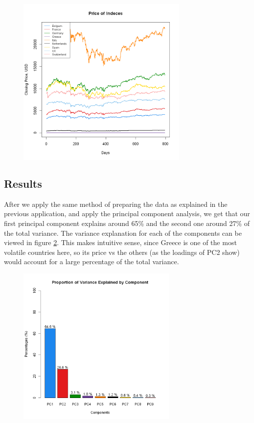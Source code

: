 \documentclass{article}
\begin{document}
\begin{figure}[H]
    \caption{}
    \centering
    \includegraphics[width=0.75\textwidth]{index_prices.png}
    \label{index_prices}
\end{figure}

\subsection{Results}

After we apply the same method of preparing the data as explained in the previous application, and apply the principal component analysis, we get that our first principal component explains around 65\% and the second one around 27\% of the total variance. The variance explanation for each of the components can be viewed in figure \ref{indexvars}. This makes intuitive sense, since Greece is one of the most volatile countries here, so its price vs the others (as the loadings of PC2 show) would account for a large percentage of the total variance.

\begin{figure}[H]
    \caption{}
    \centering
    \includegraphics[width=0.7\textwidth]{index_variance.png}
    \label{indexvars}
\end{figure}
\end{document}
